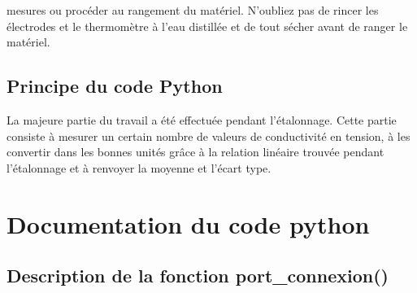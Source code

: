 \documentclass[letterpaper,10pt,french]{sphinxmanual}
\begin{document}
\sphinxAtStartPar
mesures ou procéder au rangement du matériel. N’oubliez pas de rincer les électrodes et le
thermomètre à l’eau distillée et de tout sécher avant de ranger le matériel.


\section{Principe du code Python}
\label{\detokenize{Mesures:principe-du-code-python}}
\sphinxAtStartPar
La majeure partie du travail a été effectuée pendant l’étalonnage. Cette partie consiste à mesurer un certain nombre de valeurs de conductivité en tension, à les convertir dans les bonnes unités grâce à la relation linéaire trouvée pendant l’étalonnage et à renvoyer la moyenne et l’écart type.

\sphinxstepscope


\chapter{Documentation du code python}
\label{\detokenize{Documentation:documentation-du-code-python}}\label{\detokenize{Documentation::doc}}

\section{Description de la fonction port\_connexion()}
\label{\detokenize{Documentation:description-de-la-fonction-port-connexion}}
\end{document}
